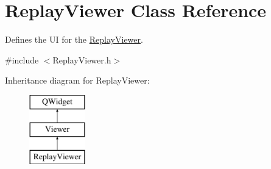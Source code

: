 \hypertarget{class_replay_viewer}{\section{Replay\-Viewer Class Reference}
\label{class_replay_viewer}
}


Defines the U\-I for the \hyperlink{class_replay_viewer}{Replay\-Viewer}.  




{\ttfamily \#include $<$Replay\-Viewer.\-h$>$}

Inheritance diagram for Replay\-Viewer\-:\begin{figure}[H]
\begin{center}
\leavevmode
\includegraphics[height=3.000000cm]{class_replay_viewer}
\end{center}
\end{figure}
